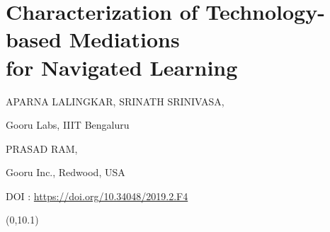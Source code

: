 \chapter{Characterization of Technology-based Mediations\\ for Navigated Learning}

\begin{center}
{\large\uppercase{APARNA LALINGKAR, SRINATH SRINIVASA}}, 

\vskip -6pt

Gooru Labs, IIIT Bengaluru

\bigskip
{\large\uppercase{PRASAD RAM,}} 

\vskip -6pt

Gooru Inc., Redwood, USA
\end{center}

\vskip 2.3cm

\centerline{DOI : \url{https://doi.org/10.34048/2019.2.F4}}

\vfill



\begin{textblock}{16}(0,10.1)
\noindent{}
\end{textblock}


\newpage

